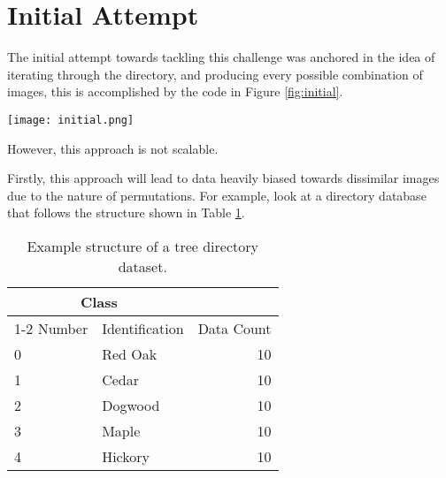\documentclass[
	letterpaper, %
	10pt, %
	unnumberedsections, %
	twoside, %
]{LTJournalArticle}
\begin{document}
\section{Initial Attempt}

The initial attempt towards tackling this challenge was anchored in the idea of iterating through the directory, and producing every possible combination of images, this is accomplished by the code in Figure \ref{fig:initial}.

\begin{figure*} %
	\texttt{[image: initial.png]}
	\caption{The initial Python code for developing a generator for Siamese Neural Networks.}
	\label{fig:initial}
\end{figure*}

However, this approach is not scalable. %

Firstly, this approach will lead to data heavily biased towards dissimilar images due to the nature of permutations. For example, look at a directory database that follows the structure shown in Table \ref{tab:structure}.

\begin{table}[h!] %
	\caption{Example structure of a tree directory dataset.}
	\centering
	\begin{tabular}{l l r}
		\toprule
		\multicolumn{2}{c}{Class} \\
		\cmidrule(r){1-2}
		Number & Identification & Data Count \\
		\midrule
		0 & Red Oak & 10 \\
		1 & Cedar & 10 \\
		2 & Dogwood & 10 \\
		3 & Maple & 10 \\
		4 & Hickory & 10 \\
		\bottomrule
	\end{tabular}
	\label{tab:structure}
\end{table}
\end{document}
